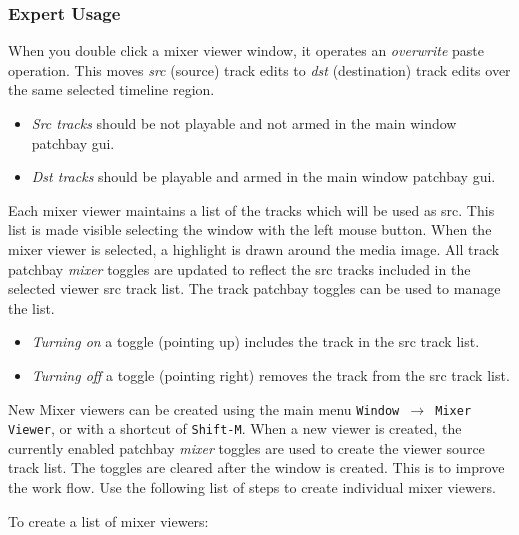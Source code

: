 \subsubsection*{Expert Usage}%
\label{ssub:expert_usage}

When you double click a mixer viewer window, it operates an \textit{overwrite} paste operation.  This moves \textit{src} (source) track edits to \textit{dst} (destination) track edits over the same selected timeline region.

\begin{itemize}[noitemsep]
    \item \textit{Src tracks} should be not playable and not armed in the main window patchbay gui.
    \item \textit{Dst tracks} should be playable and armed in the main window patchbay gui.
\end{itemize}

Each mixer viewer maintains a list of the tracks which will be used as src. This list is made visible selecting the window with the left mouse button.  When the mixer viewer is selected, a highlight is drawn around the media image.  All track patchbay \textit{mixer} toggles are updated to reflect the src tracks included in the selected viewer src track list. The track patchbay toggles can be used to manage the list.

\begin{itemize}[noitemsep]
    \item \textit{Turning on} a toggle (pointing up) includes the track in the src track list.
    \item \textit{Turning off} a toggle (pointing right) removes the track from the src track list.
\end{itemize}

New Mixer viewers can be created using the main menu \texttt{Window $\rightarrow$ Mixer Viewer}, or with a shortcut of \texttt{Shift-M}.  When a new viewer is created, the currently enabled patchbay \textit{mixer} toggles are used to create the viewer source track list.  The toggles are cleared after the window is created.  This is to improve the work flow.  Use the following list of steps to create individual mixer viewers.

To create a list of mixer viewers:

